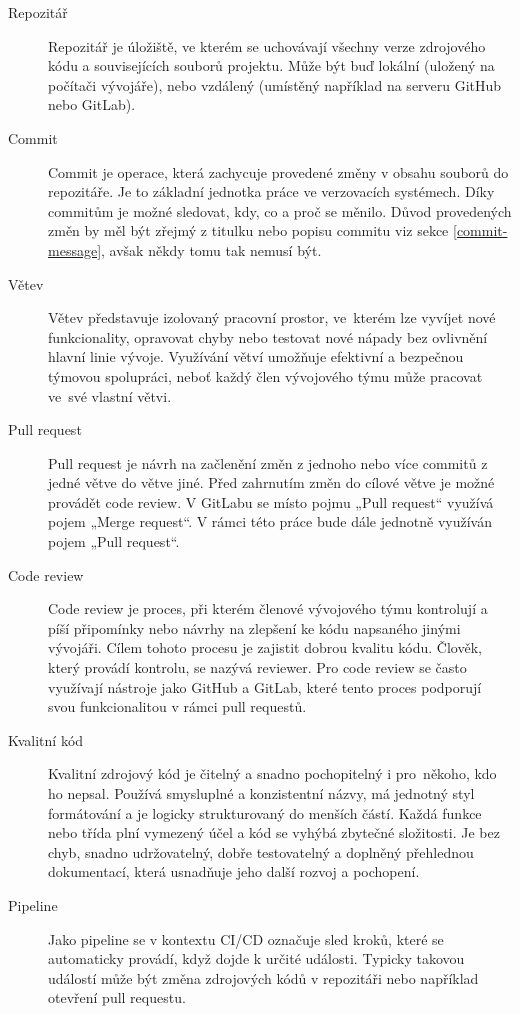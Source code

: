 \begin{description}
    \item[Repozitář] Repozitář je úložiště, ve kterém se uchovávají všechny verze zdrojového kódu a souvisejících souborů projektu. Může být buď lokální (uložený na počítači vývojáře), nebo vzdálený (umístěný například na serveru GitHub nebo GitLab). \cite{pro-git}
    \item[Commit] Commit je operace, která zachycuje provedené změny v obsahu souborů do repozitáře. Je to základní jednotka práce ve verzovacích systémech. Díky commitům je možné sledovat, kdy, co a proč se měnilo. \cite{pro-git} Důvod provedených změn by měl být zřejmý z titulku nebo popisu commitu viz sekce \ref{commit-message}, avšak někdy tomu tak nemusí být.
    \item[Větev] Větev představuje izolovaný pracovní prostor, ve~kterém lze vyvíjet nové funkcionality, opravovat chyby nebo testovat nové nápady bez ovlivnění hlavní linie vývoje. Využívání větví umožňuje efektivní a bezpečnou týmovou spolupráci, neboť každý člen vývojového týmu může pracovat ve~své vlastní větvi. \cite{pro-git}
    \item[Pull request] Pull request je návrh na začlenění změn z jednoho nebo více commitů z jedné větve do větve jiné. Před zahrnutím změn do cílové větve je možné provádět code review. V GitLabu se místo pojmu „Pull request“ využívá pojem „Merge request“. \cite{pro-git} V rámci této práce bude dále jednotně využíván pojem „Pull request“.
    \item[Code review] Code review je proces, při kterém členové vývojového týmu kontrolují a píší připomínky nebo návrhy na zlepšení ke kódu napsaného jinými vývojáři. Cílem tohoto procesu je zajistit dobrou kvalitu kódu. Člověk, který provádí kontrolu, se nazývá reviewer. \cite{code-review} Pro code review se často využívají nástroje jako GitHub a GitLab, které tento proces podporují svou funkcionalitou v rámci pull requestů.
    \item[Kvalitní kód] Kvalitní zdrojový kód je čitelný a snadno pochopitelný i pro~někoho, kdo ho nepsal. Používá smysluplné a konzistentní názvy, má jednotný styl formátování a je logicky strukturovaný do menších částí. Každá funkce nebo třída plní vymezený účel a kód se vyhýbá zbytečné složitosti. Je bez chyb, snadno udržovatelný, dobře testovatelný a doplněný přehlednou dokumentací, která usnadňuje jeho další rozvoj a pochopení. \cite{code-quality}
    \item[Pipeline] Jako pipeline se v kontextu CI/CD označuje sled kroků, které se automaticky provádí, když dojde k určité události. Typicky takovou událostí může být změna zdrojových kódů v repozitáři nebo například otevření pull requestu.

\end{description}
